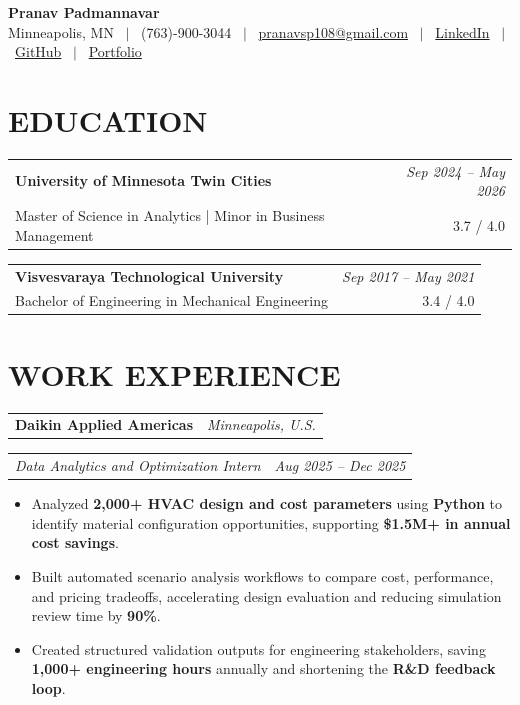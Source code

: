 \documentclass[10pt,letterpaper]{article}
\makeatletter
\newcommand{\roleonly}[2]{%
  \noindent
  \begin{tabularx}{\linewidth}{@{}X r@{}}
    \textit{#1} & \textit{#2}
  \end{tabularx}\vspace{0pt}%
}
\makeatother
\begin{document}

\begin{center}
  {\large\textbf{Pranav Padmannavar}} \\[2pt]
  \small
    Minneapolis, MN \ $|$ \ (763)-900-3044 \ $|$ \ 
    \href{mailto:pranavsp108@gmail.com}{pranavsp108@gmail.com} \ $|$ \ 
    \href{https://www.linkedin.com/in/pranavsp108/}{LinkedIn} \ $|$ \ 
    \href{https://github.com/pranavsp108}{GitHub} \ $|$ \ 
    \href{https://pranavsp108.github.io/}{Portfolio}
\end{center}

\section{EDUCATION}
\noindent
\begin{tabularx}{\linewidth}{@{}X r@{}}
  \textbf{University of Minnesota Twin Cities} & \textit{Sep 2024 -- May 2026 } \\[-1pt]
  Master of Science in Analytics \;|\; Minor in Business Management & 3.7 / 4.0
\end{tabularx}
\vspace{1pt}
\noindent
\begin{tabularx}{\linewidth}{@{}X r@{}}
  \textbf{Visvesvaraya Technological University} & \textit{Sep 2017 -- May 2021 } \\[-1pt]
  Bachelor of Engineering in Mechanical Engineering & 3.4 / 4.0
\end{tabularx}

\section{WORK EXPERIENCE}

\noindent \begin{tabularx}{\linewidth}{@{} X r@{} }
{\fontsize{11pt}{13pt}\selectfont \textbf{Daikin Applied Americas} } & \textit{Minneapolis, U.S.}
\end{tabularx}\vspace{-2pt}
\roleonly{Data Analytics and Optimization Intern}{Aug 2025 -- Dec 2025 }
\begin{itemize}
  \item Analyzed \textbf{2,000+ HVAC design and cost parameters} using \textbf{Python} to identify material configuration opportunities, supporting \textbf{\$1.5M+ in annual cost savings}.
  \item Built automated scenario analysis workflows to compare cost, performance, and pricing tradeoffs, accelerating design evaluation and reducing simulation review time by \textbf{90\%}.
  \item Created structured validation outputs for engineering stakeholders, saving \textbf{1,000+ engineering hours} annually and shortening the \textbf{R\&D feedback loop}.
\end{itemize}
\end{document}
